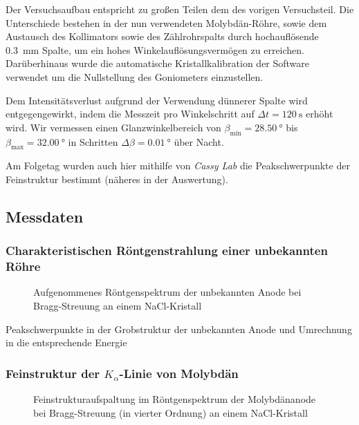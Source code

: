 \documentclass[10pt, a4paper]{article}
\begin{document}
Der Versuchsaufbau entspricht zu großen Teilen dem des vorigen Versuchsteil.
Die Unterschiede bestehen in der nun verwendeten Molybdän-Röhre, sowie dem Austausch des Kollimators sowie des Zählrohrspalts durch hochauflösende \SI{0,3}{\milli\metre} Spalte, um ein hohes Winkelauflösungsvermögen zu erreichen.
Darüberhinaus wurde die automatische Kristallkalibration der Software verwendet um die Nullstellung des Goniometers einzustellen.

Dem Intensitätsverlust aufgrund der Verwendung dünnerer Spalte wird entgegengewirkt, indem die Messzeit pro Winkelschritt auf $\Delta t = \SI{120}{\second}$ erhöht wird.
Wir vermessen einen Glanzwinkelbereich von $\beta_\mathrm{min} = \SI{28,50}{\degree}$ bis $\beta_\mathrm{max} = \SI{32,00}{\degree}$ in Schritten $\Delta \beta = \SI{0,01}{\degree}$ über Nacht.

Am Folgetag wurden auch hier mithilfe von \emph{Cassy Lab} die Peakschwerpunkte der Feinstruktur bestimmt (näheres in der Auswertung).

\newpage
\subsection{Messdaten}
\subsubsection{Charakteristischen Röntgenstrahlung einer unbekannten Röhre}


\begin{figure}[!h]
\centering

\caption{Aufgenommenes Röntgenspektrum der unbekannten Anode bei Bragg-Streuung an einem NaCl-Kristall}
\label{fig:anode3}
\end{figure}

\begin{table}[!h]
\centering

\caption{Peakschwerpunkte in der Grobstruktur der unbekannten Anode und Umrechnung in die entsprechende Energie}
\label{tab:peakschwerpunkt_grobstruktur}
\end{table}

\newpage
\subsubsection{Feinstruktur der $K_\alpha$-Linie von Molybdän}

\begin{figure}[!h]
\centering

\caption{Feinstrukturaufspaltung im Röntgenspektrum der Molybdänanode bei Bragg-Streuung (in vierter Ordnung) an einem NaCl-Kristall}
\label{fig:feinstruktur}
\end{figure}
\end{document}
